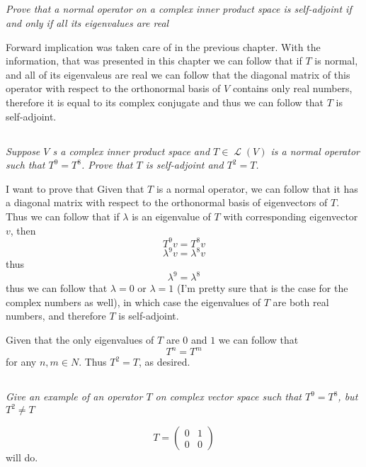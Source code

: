 \documentclass[11pt,oneside,titlepage]{book}
\DeclareMathOperator \map {\mathcal {L}}
\begin{document}
\subsection{}

\textit{Prove that a normal operator on a complex inner product space is self-adjoint if and
  only if all its eigenvalues are real}

Forward implication was taken care of in the previous chapter. With the information,
that was presented in this chapter we can follow that if $T$ is normal, and all of its
eigenvaleus are real we can follow that the diagonal matrix of this operator
with respect to the orthonormal basis of $V$ contains only real numbers, therefore it is
equal to its complex conjugate and thus we can follow that $T$ is self-adjoint.


\subsection{}

\textit{Suppose $V$ s a complex inner product space and $T \in \map(V)$ is a normal operator
  such that $T^9 = T^8$. Prove that $T$ is self-adjoint and $T^2 = T$.}

I want to prove that 
Given that $T$ is a normal operator, we can follow that it has a diagonal matrix with respect to
the orthonormal basis of eigenvectors of $T$. Thus we can follow that if $\lambda$ is an
eigenvalue of $T$ with corresponding eigenvector $v$, then
$$T^9 v = T^8 v$$
$$\lambda^9 v = \lambda^8 v$$
thus
$$\lambda^9 = \lambda^8$$
thus we can follow that $\lambda = 0$ or $\lambda = 1$ (I'm pretty sure that is the case
for the complex numbers as well), in which case the eigenvalues of $T$
are both real numbers, and therefore $T$ is self-adjoint.

Given that the only eigenvalues of $T$ are $0$ and $1$ we can follow that
$$T^n = T^m$$ for any  $n, m \in N$. Thus $T^2 = T$, as desired.

\subsection{}

\textit{Give an example of an operator $T$ on complex vector space such that
  $T^9 = T^8$, but $T^2 \neq T$}

$$T =
\begin{pmatrix}
0 & 1 \\
0 & 0  
\end{pmatrix}
$$
will do.
\end{document}
